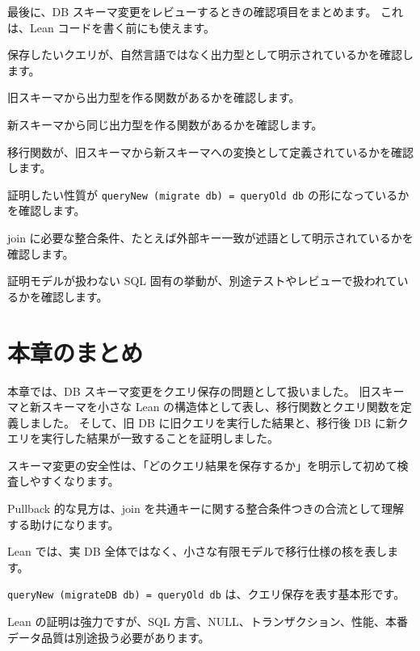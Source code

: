 最後に、DB スキーマ変更をレビューするときの確認項目をまとめます。
これは、Lean コードを書く前にも使えます。

保存したいクエリが、自然言語ではなく出力型として明示されているかを確認します。

旧スキーマから出力型を作る関数があるかを確認します。

新スキーマから同じ出力型を作る関数があるかを確認します。

移行関数が、旧スキーマから新スキーマへの変換として定義されているかを確認します。

証明したい性質が \texttt{queryNew (migrate db) = queryOld db} の形になっているかを確認します。

join に必要な整合条件、たとえば外部キー一致が述語として明示されているかを確認します。

証明モデルが扱わない SQL 固有の挙動が、別途テストやレビューで扱われているかを確認します。

\section{本章のまとめ}

本章では、DB スキーマ変更をクエリ保存の問題として扱いました。
旧スキーマと新スキーマを小さな Lean の構造体として表し、移行関数とクエリ関数を定義しました。
そして、旧 DB に旧クエリを実行した結果と、移行後 DB に新クエリを実行した結果が一致することを証明しました。

スキーマ変更の安全性は、「どのクエリ結果を保存するか」を明示して初めて検査しやすくなります。

Pullback 的な見方は、join を共通キーに関する整合条件つきの合流として理解する助けになります。

Lean では、実 DB 全体ではなく、小さな有限モデルで移行仕様の核を表します。

\texttt{queryNew (migrateDB db) = queryOld db} は、クエリ保存を表す基本形です。

Lean の証明は強力ですが、SQL 方言、NULL、トランザクション、性能、本番データ品質は別途扱う必要があります。
